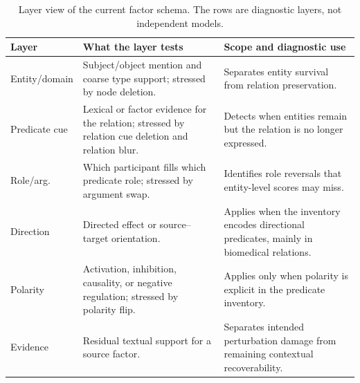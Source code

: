 \begin{table}[t]
\centering
\caption{Layer view of the current factor schema. The rows are diagnostic layers, not independent models.}
\label{tab:layer-profile}
\scriptsize
\begin{tabularx}{\textwidth}{p{}p{}Y}
\toprule
Layer & What the layer tests & Scope and diagnostic use \\
\midrule
Entity/domain & Subject/object mention and coarse type support; stressed by node deletion. & Separates entity survival from relation preservation. \\
Predicate cue & Lexical or factor evidence for the relation; stressed by relation cue deletion and relation blur. & Detects when entities remain but the relation is no longer expressed. \\
Role/arg. & Which participant fills which predicate role; stressed by argument swap. & Identifies role reversals that entity-level scores may miss. \\
Direction & Directed effect or source--target orientation. & Applies when the inventory encodes directional predicates, mainly in biomedical relations. \\
Polarity & Activation, inhibition, causality, or negative regulation; stressed by polarity flip. & Applies only when polarity is explicit in the predicate inventory. \\
Evidence & Residual textual support for a source factor. & Separates intended perturbation damage from remaining contextual recoverability. \\
\bottomrule
\end{tabularx}
\end{table}
